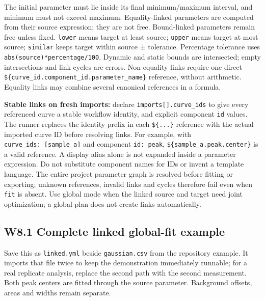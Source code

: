 \documentclass[
  10pt,
  a4paper,
  oneside]{scrreprt}
\begin{document}
The initial parameter must lie inside its final minimum/maximum
interval, and minimum must not exceed maximum. Equality-linked
parameters are computed from their source expression; they are not free.
Bound-linked parameters remain free unless fixed. \texttt{lower} means
target at least source; \texttt{upper} means target at most source;
\texttt{similar} keeps target within source ± tolerance. Percentage
tolerance uses \texttt{abs(source)*percentage/100}. Dynamic and static
bounds are intersected; empty intersections and link cycles are errors.
Non-equality links require one direct
\texttt{\$\{curve\_id.component\_id.parameter\_name\}} reference,
without arithmetic. Equality links may combine several canonical
references in a formula.

\textbf{Stable links on fresh imports:} declare
\texttt{imports{[}{]}.curve\_ids} to give every referenced curve a
stable workflow identity, and explicit component \texttt{id} values. The
runner replaces the identity prefix in each \texttt{\$\{...\}} reference
with the actual imported curve ID before resolving links. For example,
with \texttt{curve\_ids:\ {[}sample\_a{]}} and component
\texttt{id:\ peak}, \texttt{\$\{sample\_a.peak.center\}} is a valid
reference. A display alias alone is not expanded inside a parameter
expression. Do not substitute component names for IDs or invent a
template language. The entire project parameter graph is resolved before
fitting or exporting; unknown references, invalid links and cycles
therefore fail even when \texttt{fit} is absent. Use global mode when
the linked source and target need joint optimization; a global plan does
not create links automatically.

\hypertarget{w8.1-complete-linked-global-fit-example}{%
\subsection{W8.1 Complete linked global-fit
example}\label{w8.1-complete-linked-global-fit-example}}

Save this as \texttt{linked.yml} beside \texttt{gaussian.csv} from the
repository example. It imports that file twice to keep the demonstration
immediately runnable; for a real replicate analysis, replace the second
path with the second measurement. Both peak centers are fitted through
the source parameter. Background offsets, areas and widths remain
separate.
\end{document}

